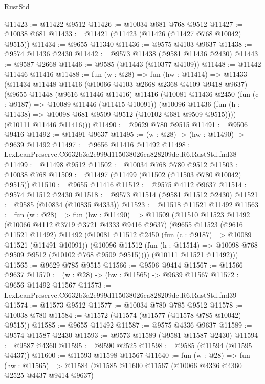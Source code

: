 \begin{lexlean}{RustStd}
\begin{coremodule}
@11423 := @11422 @9512
@11426 := @10034 @681 @768 @9512
@11427 := @10038 @681
@11433 := @11421 (@11423 (@11426 (@11427 @768 @10042) @9515))
@11434 := @9655 @11340
@11436 := @9575 @4103 @9637
@11438 := @9574 @11436 @2430
@11442 := @9573 @11438 (@9581 @11436 @2430)
@11443 := @9587 @2668
@11446 := @9585 (@11443 (@10377 @4109))
@11448 := @11442 @11446 @11416
@11488 := fun (w : @28) =>
  fun (hw : @11414) =>
  @11433
    (@11434
      @11448
      @11416
      (@10066 @4103 @2668 @2368 @4109 @9418 @9637)
      (@9655
        @11448
        (@9616 @11446 @11416)
        @11416
        (@10081
          @11436
          @2450
          (fun (c : @9187) => @10089 @11446 (@11415 @10091))
          (@10096 @11436 (fun (h : @11438) => @10098 @681 @9509 @9512 (@10102 @681 @9509 @9515))))
        (@10111 @11446 @11416)))
@11490 := @9629 @780 @9515
@11491 := @9506 @9416
@11492 := @11491 @9637
@11495 := (w : @28) -> (hw : @11490) -> @9639 @11492
@11497 := @9656 @11416 @11492
@11498 := LexLeanPreserve.C6632b3a2e999d115038026ca828209de.R6.RustStd.fnd38
@11499 := @11498 @9512
@11502 := @10034 @768 @780 @9512
@11503 := @10038 @768
@11509 := @11497 (@11499 (@11502 (@11503 @780 @10042) @9515))
@11510 := @9655 @11416
@11512 := @9575 @4112 @9637
@11514 := @9574 @11512 @2430
@11518 := @9573 @11514 (@9581 @11512 @2430)
@11521 := @9585 (@10834 (@10835 @4333))
@11523 := @11518 @11521 @11492
@11563 := fun (w : @28) =>
  fun (hw : @11490) =>
  @11509
    (@11510
      @11523
      @11492
      (@10066 @4112 @3719 @3721 @4333 @9416 @9637)
      (@9655
        @11523
        (@9616 @11521 @11492)
        @11492
        (@10081
          @11512
          @2450
          (fun (c : @9187) => @10089 @11521 (@11491 @10091))
          (@10096 @11512 (fun (h : @11514) => @10098 @768 @9509 @9512 (@10102 @768 @9509 @9515))))
        (@10111 @11521 @11492)))
@11565 := @9629 @785 @9515
@11566 := @9506 @9414
@11567 := @11566 @9637
@11570 := (w : @28) -> (hw : @11565) -> @9639 @11567
@11572 := @9656 @11492 @11567
@11573 := LexLeanPreserve.C6632b3a2e999d115038026ca828209de.R6.RustStd.fnd39
@11574 := @11573 @9512
@11577 := @10034 @780 @785 @9512
@11578 := @10038 @780
@11584 := @11572 (@11574 (@11577 (@11578 @785 @10042) @9515))
@11585 := @9655 @11492
@11587 := @9575 @4336 @9637
@11589 := @9574 @11587 @2430
@11593 := @9573 @11589 (@9581 @11587 @2430)
@11594 := @9587 @4360
@11595 := @9590 @2525
@11598 := @9585 (@11594 (@11595 @4437))
@11600 := @11593 @11598 @11567
@11640 := fun (w : @28) =>
  fun (hw : @11565) =>
  @11584
    (@11585
      @11600
      @11567
      (@10066 @4336 @4360 @2525 @4437 @9414 @9637)

\end{coremodule}
\end{lexlean}
